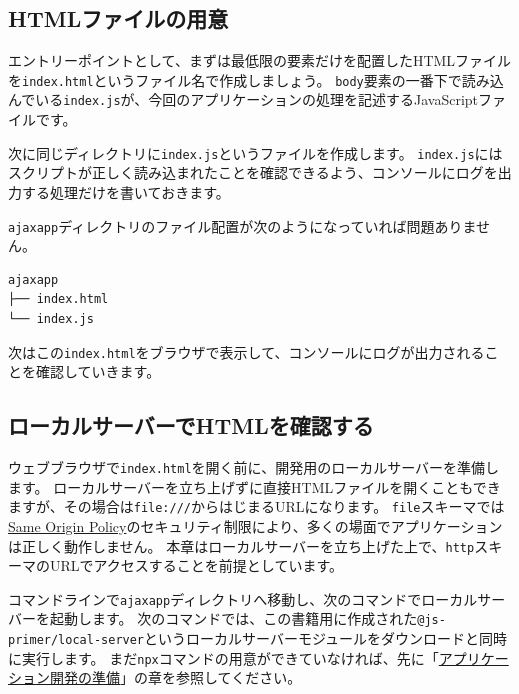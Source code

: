\hypertarget{preparing-html}{%
\subsection{HTMLファイルの用意}\label{preparing-html}}

エントリーポイントとして、まずは最低限の要素だけを配置したHTMLファイルを\texttt{index.html}というファイル名で作成しましょう。
\texttt{body}要素の一番下で読み込んでいる\texttt{index.js}が、今回のアプリケーションの処理を記述するJavaScriptファイルです。



次に同じディレクトリに\texttt{index.js}というファイルを作成します。
\texttt{index.js}にはスクリプトが正しく読み込まれたことを確認できるよう、コンソールにログを出力する処理だけを書いておきます。



\texttt{ajaxapp}ディレクトリのファイル配置が次のようになっていれば問題ありません。

\begin{lstlisting}
ajaxapp
├── index.html
└── index.js
\end{lstlisting}

次はこの\texttt{index.html}をブラウザで表示して、コンソールにログが出力されることを確認していきます。

\hypertarget{local-server}{%
\subsection{ローカルサーバーでHTMLを確認する}\label{local-server}}

ウェブブラウザで\texttt{index.html}を開く前に、開発用のローカルサーバーを準備します。
ローカルサーバーを立ち上げずに直接HTMLファイルを開くこともできますが、その場合は\texttt{file:///}からはじまるURLになります。
\texttt{file}スキーマでは\href{https://developer.mozilla.org/ja/docs/Web/Security/Same-origin_policy}{Same
Origin
Policy}のセキュリティ制限により、多くの場面でアプリケーションは正しく動作しません。
本章はローカルサーバーを立ち上げた上で、\texttt{http}スキーマのURLでアクセスすることを前提としています。

コマンドラインで\texttt{ajaxapp}ディレクトリへ移動し、次のコマンドでローカルサーバーを起動します。
次のコマンドでは、この書籍用に作成された\texttt{@js-primer/local-server}というローカルサーバーモジュールをダウンロードと同時に実行します。
まだ\texttt{npx}コマンドの用意ができていなければ、先に「\hyperlink{setup-local-env}{アプリケーション開発の準備}」の章を参照してください。

